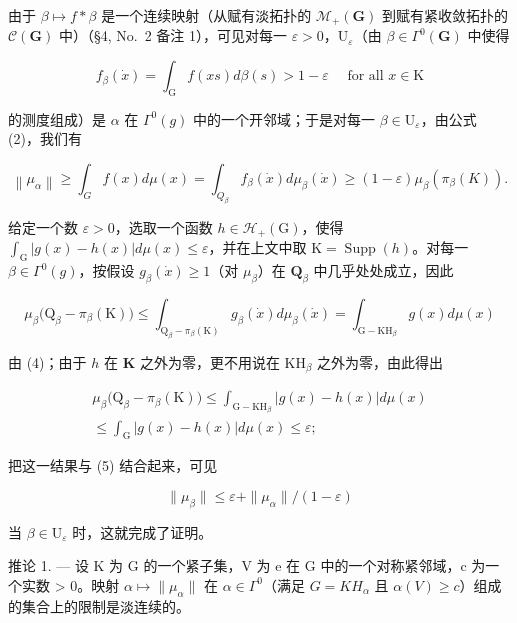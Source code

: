 由于 \(\beta \mapsto f * \beta\) 是一个连续映射（从赋有淡拓扑的 \(\mathcal{M}_{+}(\mathbf{G})\) 到赋有紧收敛拓扑的 \(\mathcal{C}(\mathbf{G})\) 中）（§4, No.~2 备注 1），可见对每一 \(\varepsilon > 0\)，\(\mathrm{U}_{\varepsilon}\)（由 \(\beta \in \Gamma^0 (\mathbf{G})\) 中使得

\[
f _ {\beta} (\dot {x}) = \int_ {\mathrm{G}} f (x s) d \beta (s) > 1 - \varepsilon \quad \text { for   all } x \in \mathrm{K}
\]

的测度组成）是 \(\alpha\) 在 \(\Gamma^0 (g)\) 中的一个开邻域；于是对每一 \(\beta \in \mathrm{U}_{\varepsilon}\)，由公式 (2)，我们有

\[
\left\| \mu_ {\alpha} \right\| \geqslant \int_ {G} f (x) d \mu (x) = \int_ {Q _ {\beta}} f _ {\beta} (\dot {x}) d \mu_ {\beta} (\dot {x}) \geqslant (1 - \varepsilon) \mu_ {\beta} \left(\pi_ {\beta} (K)\right).\tag{5}
\]

给定一个数 \(\varepsilon > 0\)，选取一个函数 \(h \in \mathcal{H}_{+}(\mathrm{G})\)，使得 \(\int_{\mathrm{G}} |g(x) - h(x)| d\mu(x) \leqslant \varepsilon\)，并在上文中取 \(\mathrm{K} = \operatorname{Supp}(h)\)。对每一 \(\beta \in \Gamma^0(g)\)，按假设 \(g_\beta(\dot{x}) \geqslant 1\)（对 \(\mu_\beta\)）在 \(\mathbf{Q}_\beta\) 中几乎处处成立，因此

\[
\mu_ {\beta} \big (\mathrm{Q} _ {\beta} - \pi_ {\beta} (\mathrm{K}) \big) \leqslant \int_ {\mathrm{Q} _ {\beta} - \pi_ {\beta} (\mathrm{K})} g _ {\beta} (\dot {x}) d \mu_ {\beta} (\dot {x}) = \int_ {\mathrm{G} - \mathrm{KH} _ {\beta}} g (x) d \mu (x)
\]

由 (4)；由于 \(h\) 在 \(\mathbf{K}\) 之外为零，更不用说在 \(\mathrm{KH}_{\beta}\) 之外为零，由此得出

\[
\begin{array}{c} \mu_ {\beta} \big (\mathrm{Q} _ {\beta} - \pi_ {\beta} (\mathrm{K}) \big) \leqslant \int_ {\mathrm{G} - \mathrm{KH} _ {\beta}} | g (x) - h (x) | d \mu (x) \\ \leqslant \int_ {\mathrm{G}} | g (x) - h (x) | d \mu (x) \leqslant \varepsilon ; \end{array}
\]

把这一结果与 (5) 结合起来，可见

\[
\| \mu_ {\beta} \| \leqslant \varepsilon + \| \mu_ {\alpha} \| / (1 - \varepsilon)
\]

当 \(\beta \in \mathrm{U}_{\varepsilon}\) 时，这就完成了证明。

推论 1. --- 设 K 为 G 的一个紧子集，V 为 e 在 G 中的一个对称紧邻域，c 为一个实数 \textgreater{} 0。映射 \(\alpha \mapsto \|\mu_{\alpha}\|\) 在 \(\alpha \in \Gamma^0\)（满足 \(G = KH_{\alpha}\) 且 \(\alpha(V) \geqslant c\)）组成的集合上的限制是淡连续的。

